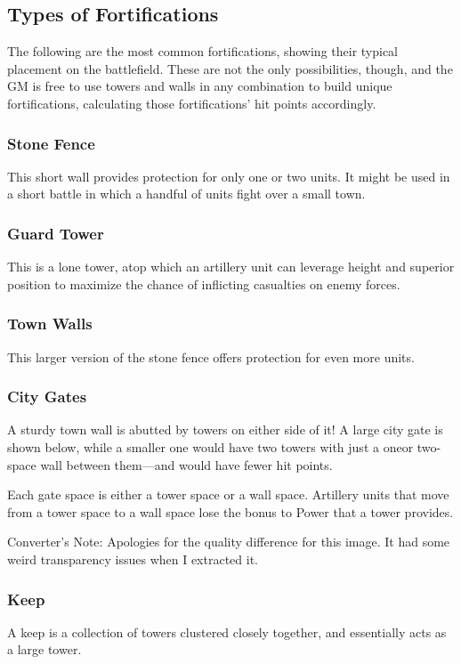 \documentclass[10pt,a4paper,twoside,bg=print,twocolumn,openany,nodeprecatedcode]{dndbook}
\begin{document}
\subsection{Types of Fortifications}
The following are the most common fortifications, showing their typical placement on the battlefield. These are not the only possibilities, though, and the GM is free to use towers and walls in any combination to build unique fortifications, calculating those fortifications' hit points accordingly.

\subsubsection{Stone Fence}
This short wall provides protection for only one or two units. It might be used in a short battle in which a handful of units fight over a small town.

\subsubsection{Guard Tower}
This is a lone tower, atop which an artillery unit can leverage height and superior position to maximize the chance of inflicting casualties on enemy forces.

\subsubsection{Town Walls}
This larger version of the stone fence offers protection for even more units.

\subsubsection{City Gates}
A sturdy town wall is abutted by towers on either side of it! A large city gate is shown below, while a smaller one would have two towers with just a oneor two-space wall between them—and would have fewer hit points.

Each gate space is either a tower space or a wall space. Artillery units that move from a tower space to a wall space lose the bonus to Power that a tower provides.

Converter's Note: Apologies for the quality difference for this image. It had some weird transparency issues when I extracted it.

\subsubsection{Keep}
A keep is a collection of towers clustered closely together, and essentially acts as a large tower.
\end{document}
